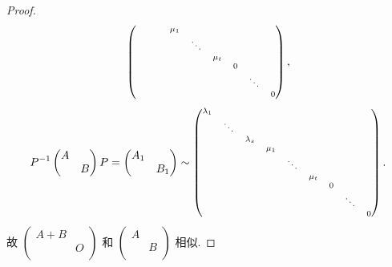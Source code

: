\documentclass[../../main.tex]{subfiles}
\begin{document}
\begin{proof}
\begin{align*}
\begin{scriptsize}
\begin{pmatrix}
&		&		&		\mu _1&		&		&		&		&		\\
&		&		&		&		\ddots&		&		&		&		\\
&		&		&		&		&		\mu _t&		&		&		\\
&		&		&		&		&		&		0&		&		\\
&		&		&		&		&		&		&		\ddots&		\\
&		&		&		&		&		&		&		&		0\\
\end{pmatrix}\end{scriptsize},
\end{align*}
\begin{align*}
P^{-1}\begin{pmatrix}
A&		\\
&		B\\
\end{pmatrix} P=\begin{pmatrix}
A_1&		\\
&		B_1\\
\end{pmatrix} \sim \begin{scriptsize}\begin{pmatrix}
\lambda _1&		&		&		&		&		&		&		&		\\
&		\ddots&		&		&		&		&		&		&		\\
&		&		\lambda _s&		&		&		&		&		&		\\
&		&		&		\mu _1&		&		&		&		&		\\
&		&		&		&		\ddots&		&		&		&		\\
&		&		&		&		&		\mu _t&		&		&		\\
&		&		&		&		&		&		0&		&		\\
&		&		&		&		&		&		&		\ddots&		\\
&		&		&		&		&		&		&		&		0\\
\end{pmatrix}\end{scriptsize}.
\end{align*}
故 $\begin{pmatrix}
A+B&		\\
&		O\\
\end{pmatrix}$ 和 $\begin{pmatrix}
A&		\\
&		B\\
\end{pmatrix}$ 相似.

\end{proof}
\end{document}
